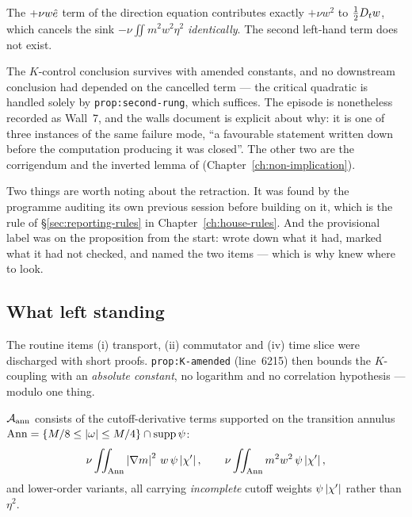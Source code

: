 \begin{statement}
\label{st:w2cancel}
\WITHDRAWN{} The \(+\nu w\hat{e}\) term of the direction equation contributes
exactly \(+\nu w^2\) to \(\tfrac12D_t w\), which cancels the sink
\(-\nu\iint m^2w^2\eta^2\) \emph{identically}. The second left-hand term does
not exist.
\end{statement}

The \(K\)-control conclusion survives with amended constants, and no
downstream conclusion had depended on the cancelled term --- the critical
quadratic is handled solely by \texttt{prop:second-rung}, which suffices. The
episode is nonetheless recorded as Wall~7, and the walls document is explicit
about why: it is one of three instances of the same failure mode, ``a
favourable statement written down before the computation producing it was
closed''. The other two are the  corrigendum and the inverted lemma of
 (Chapter~\ref{ch:non-implication}).

Two things are worth noting about the retraction. It was found by the
programme auditing its own previous session before building on it, which is
the rule of \S\ref{sec:reporting-rules} in Chapter~\ref{ch:house-rules}. And
the provisional label was on the proposition from the start:  wrote
down what it had, marked what it had not checked, and named the two items ---
which is why  knew where to look.

\subsection{What \texorpdfstring{}{S36} left standing}

The routine items (i) transport, (ii) commutator and (iv) time slice were
discharged with short proofs. \texttt{prop:K-amended} (line~6215) then bounds
the \(K\)-coupling with an \emph{absolute constant}, no logarithm and no
correlation hypothesis --- modulo one thing.

\begin{defn}
\label{def:aann}
\(\mathcal{A}_{\mathrm{ann}}\) consists of the cutoff-derivative terms supported on the transition
annulus \(\mathrm{Ann}=\{M/8\le\left|\omega\right|\le M/4\}\cap\operatorname{supp}\psi\):
\[
  \nu\iint_{\mathrm{Ann}}\left|\nabla m\right|^2\,w\,\psi\left|\chi'\right|,
  \qquad
  \nu\iint_{\mathrm{Ann}}m^2w^2\,\psi\left|\chi'\right|,
\]
and lower-order variants, all carrying \emph{incomplete} cutoff weights
\(\psi\left|\chi'\right|\) rather than \(\eta^2\).
\end{defn}

